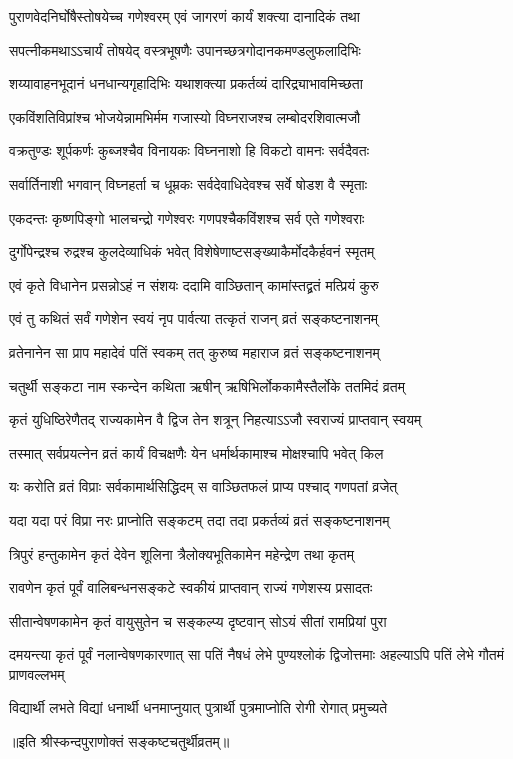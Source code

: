 \twolineshloka
{पुराणवेदनिर्घोषैस्तोषयेच्च गणेश्वरम्}
{एवं जागरणं कार्यं शक्त्या दानादिकं तथा} %


\twolineshloka
{सपत्नीकमथाऽऽचार्यं तोषयेद् वस्त्रभूषणैः}
{उपानच्छत्रगोदानकमण्डलुफलादिभिः} %


\twolineshloka
{शय्यावाहनभूदानं धनधान्यगृहादिभिः}
{यथाशक्त्या प्रकर्तव्यं दारिद्र्याभावमिच्छता} %


\twolineshloka
{एकविंशतिविप्रांश्च भोजयेन्नामभिर्मम}
{गजास्यो विघ्नराजश्च लम्बोदरशिवात्मजौ} %


\twolineshloka
{वक्रतुण्डः शूर्पकर्णः कुब्जश्चैव विनायकः}
{विघ्ननाशो हि विकटो वामनः सर्वदैवतः} %


\twolineshloka
{सर्वार्तिनाशी भगवान् विघ्नहर्ता च धूम्रकः}
{सर्वदेवाधिदेवश्च सर्वे षोडश वै स्मृताः} %


\twolineshloka
{एकदन्तः कृष्णपिङ्गो भालचन्द्रो गणेश्वरः}
{गणपश्चैकविंशश्च सर्व एते गणेश्वराः} %

\twolineshloka
{दुर्गोपेन्द्रश्च रुद्रश्च कुलदेव्याधिकं भवेत्}
{विशेषेणाष्टसङ्ख्याकैर्मोदकैर्हवनं स्मृतम्} %


\twolineshloka
{एवं कृते विधानेन प्रसन्नोऽहं न संशयः}
{ददामि वाञ्छितान् कामांस्तद्व्रतं मत्प्रियं कुरु} %


\twolineshloka
{एवं तु कथितं सर्वं गणेशेन स्वयं नृप}
{पार्वत्या तत्कृतं राजन् व्रतं सङ्कष्टनाशनम्} %


\twolineshloka
{व्रतेनानेन सा प्राप महादेवं पतिं स्वकम्}
{तत् कुरुष्व महाराज व्रतं सङ्कष्टनाशनम्} %


\twolineshloka
{चतुर्थी सङ्कटा नाम स्कन्देन कथिता ऋषीन्}
{ऋषिभिर्लोककामैस्तैर्लोके ततमिदं व्रतम्} %


\twolineshloka
{कृतं युधिष्ठिरेणैतद् राज्यकामेन वै द्विज}
{तेन शत्रून् निहत्याऽऽजौ स्वराज्यं प्राप्तवान् स्वयम्} %


\twolineshloka
{तस्मात् सर्वप्रयत्नेन व्रतं कार्यं विचक्षणैः}
{येन धर्मार्थकामाश्च मोक्षश्चापि भवेत् किल} %


\twolineshloka
{यः करोति व्रतं विप्राः सर्वकामार्थसिद्धिदम्}
{स वाञ्छितफलं प्राप्य पश्चाद् गणपतां व्रजेत्} %


\twolineshloka
{यदा यदा परं विप्रा नरः प्राप्नोति सङ्कटम्}
{तदा तदा प्रकर्तव्यं व्रतं सङ्कष्टनाशनम्} %


\twolineshloka
{त्रिपुरं हन्तुकामेन कृतं देवेन शूलिना}
{त्रैलोक्यभूतिकामेन महेन्द्रेण तथा कृतम्} %


\twolineshloka
{रावणेन कृतं पूर्वं वालिबन्धनसङ्कटे}
{स्वकीयं प्राप्तवान् राज्यं गणेशस्य प्रसादतः} %


\twolineshloka
{सीतान्वेषणकामेन कृतं वायुसुतेन च}
{सङ्कल्प्य दृष्टवान् सोऽयं सीतां रामप्रियां पुरा} %


\threelineshloka
{दमयन्त्या कृतं पूर्वं नलान्वेषणकारणात्}
{सा पतिं नैषधं लेभे पुण्यश्लोकं द्विजोत्तमाः}
{अहल्याऽपि पतिं लेभे गौतमं प्राणवल्लभम्} %

\twolineshloka
{विद्यार्थी लभते विद्यां धनार्थी धनमाप्नुयात्}
{पुत्रार्थी पुत्रमाप्नोति रोगी रोगात् प्रमुच्यते} %

\centerline{॥इति श्रीस्कन्दपुराणोक्तं सङ्कष्टचतुर्थीव्रतम्॥} %


